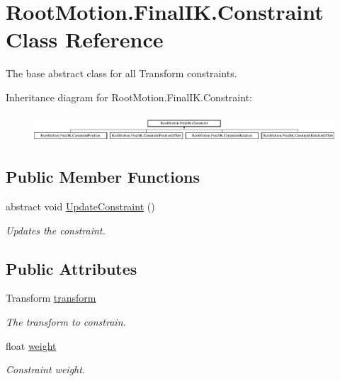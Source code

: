 \hypertarget{class_root_motion_1_1_final_i_k_1_1_constraint}{}\section{Root\+Motion.\+Final\+I\+K.\+Constraint Class Reference}
\label{class_root_motion_1_1_final_i_k_1_1_constraint}


The base abstract class for all Transform constraints.  


Inheritance diagram for Root\+Motion.\+Final\+I\+K.\+Constraint\+:\begin{figure}[H]
\begin{center}
\leavevmode
\includegraphics[height=1.052632cm]{class_root_motion_1_1_final_i_k_1_1_constraint}
\end{center}
\end{figure}
\subsection*{Public Member Functions}
\begin{DoxyCompactItemize}
\item 
abstract void \mbox{\hyperlink{class_root_motion_1_1_final_i_k_1_1_constraint_a3abc634189f065586d8d57c653c22fdd}{Update\+Constraint}} ()
\begin{DoxyCompactList}\small\item\em Updates the constraint. \end{DoxyCompactList}\end{DoxyCompactItemize}
\subsection*{Public Attributes}
\begin{DoxyCompactItemize}
\item 
Transform \mbox{\hyperlink{class_root_motion_1_1_final_i_k_1_1_constraint_a2fe5a6e41ac6da0e5cb97a231696f937}{transform}}
\begin{DoxyCompactList}\small\item\em The transform to constrain. \end{DoxyCompactList}\item 
float \mbox{\hyperlink{class_root_motion_1_1_final_i_k_1_1_constraint_a41921a1cb4b1605c80ce3b3ae7ac0786}{weight}}
\begin{DoxyCompactList}\small\item\em Constraint weight. \end{DoxyCompactList}\end{DoxyCompactItemize}

